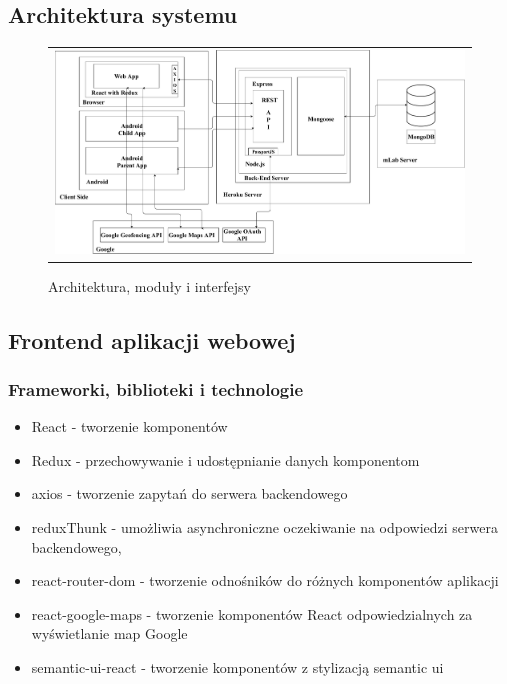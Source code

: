 \documentclass{sprawozdanie-agh}
\begin{document}
		\subsection{Architektura systemu}
		
		\begin{figure}[H] 
			\centering
			\begin{tabular}{c}
				\includegraphics[width=.95\textwidth]{moduly_interfejsy_komunikacyjne}
			\end{tabular} 
			\caption{Architektura, moduły i interfejsy}
		\end{figure}

		\subsection{Frontend aplikacji webowej}

			\subsubsection{Frameworki, biblioteki i technologie}

				\begin{itemize}
					\item React - tworzenie komponentów
					\item Redux - przechowywanie i udostępnianie danych komponentom
					\item axios - tworzenie zapytań do serwera backendowego
					\item reduxThunk - umożliwia asynchroniczne oczekiwanie na odpowiedzi serwera backendowego,
					\item react-router-dom - tworzenie odnośników do różnych komponentów aplikacji
					\item react-google-maps - tworzenie komponentów React odpowiedzialnych za wyświetlanie map Google
					\item semantic-ui-react - tworzenie komponentów z stylizacją semantic ui
				\end{itemize}
\end{document}

